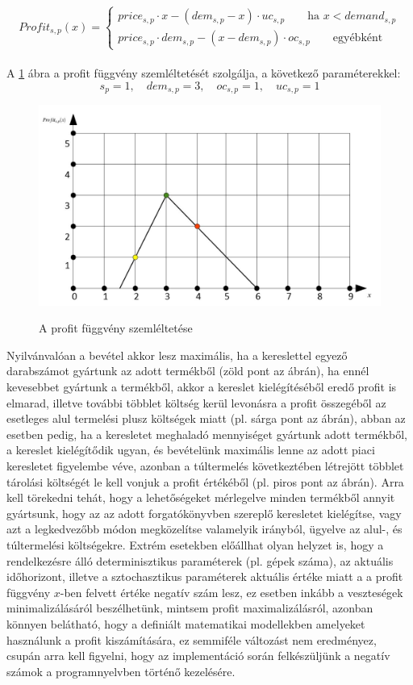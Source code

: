 \documentclass [12pt]{report}
\begin{document}
\begin{equation*}
Profit_{s,p}(x)= \begin{cases}
            price_{s,p}\cdot x-(dem_{s,p}-x) \cdot uc_{s,p}\qquad \text{ha } x<demand_{s,p} \\
            price_{s,p} \cdot dem_{s,p}-(x-dem_{s,p}) \cdot oc_{s,p}\qquad \text{egyébként}
       \end{cases}
\end{equation*}\\
A \ref{profit_func} ábra a profit függvény szemléltetését szolgálja, a következő paraméterekkel:
$$s_p=1,\quad dem_{s,p}=3, \quad oc_{s,p}=1, \quad  uc_{s,p}=1$$
\begin{figure}
\begin{center}
\includegraphics[scale=0.5]{profit_func}\\
\caption{A profit függvény szemléltetése}
\label{profit_func}
\end{center}
\end{figure}
Nyilvánvalóan a bevétel akkor lesz maximális, ha a kereslettel egyező darabszámot gyártunk az adott termékből (zöld pont az ábrán), ha ennél kevesebbet gyártunk a termékből, akkor a kereslet kielégítéséből eredő profit is elmarad, illetve további többlet költség kerül levonásra a profit összegéből az esetleges alul termelési plusz költségek miatt (pl. sárga pont az ábrán), abban az esetben pedig, ha a keresletet meghaladó mennyiséget gyártunk adott termékből, a kereslet kielégítődik ugyan, és bevételünk maximális lenne az adott piaci keresletet figyelembe véve, azonban a túltermelés következtében létrejött többlet tárolási költségét le kell vonjuk a profit értékéből (pl. piros pont az ábrán). Arra kell törekedni tehát, hogy a lehetőségeket mérlegelve minden termékből annyit gyártsunk, hogy az az adott forgatókönyvben szereplő keresletet kielégítse, vagy azt a legkedvezőbb módon megközelítse valamelyik irányból, ügyelve az alul-, és túltermelési költségekre. Extrém esetekben előállhat olyan helyzet is, hogy a rendelkezésre álló determinisztikus paraméterek (pl. gépek száma), az aktuális időhorizont, illetve a sztochasztikus paraméterek aktuális értéke miatt a a profit függvény $x$-ben felvett értéke negatív szám lesz, ez esetben inkább a veszteségek minimalizálásáról beszélhetünk, mintsem profit maximalizálásról, azonban könnyen belátható, hogy a definiált matematikai modellekben amelyeket használunk a profit kiszámítására, ez semmiféle változást nem eredményez, csupán arra kell figyelni, hogy az implementáció során felkészüljünk a negatív számok a programnyelvben történő kezelésére.
\end{document}
